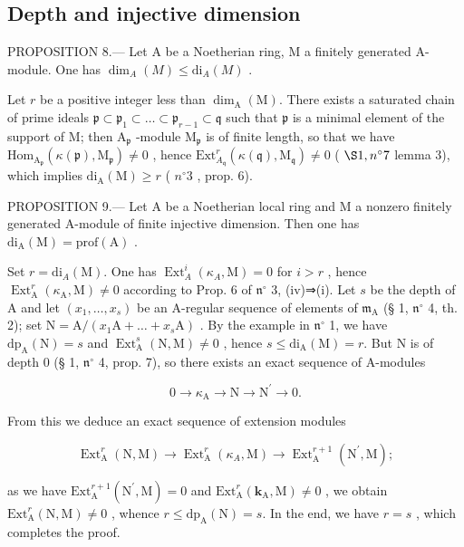 \subsection{Depth and injective dimension}

PROPOSITION 8.--- Let A be a Noetherian ring, M a finitely generated A-module. One has \(\dim_{A}(M) \leqslant \mathrm{di}_{A}(M)\) .

Let \(r\) be a positive integer less than \(\dim_{\mathrm{A}}(\mathrm{M})\). There exists a saturated chain of prime ideals \(\mathfrak{p} \subset \mathfrak{p}_{1} \subset \ldots \subset \mathfrak{p}_{r-1} \subset \mathfrak{q}\) such that \(\mathfrak{p}\) is a minimal element of the support of M; then \(\mathrm{A}_{\mathfrak{p}}\) -module \(\mathrm{M}_{\mathfrak{p}}\) is of finite length, so that we have \(\mathrm{Hom}_{\mathrm{A}_{\mathfrak{p}}}(\kappa(\mathfrak{p}), \mathrm{M}_{\mathfrak{p}}) \neq 0\) , hence \(\mathrm{Ext}_{A_{\mathfrak{q}}}^{r}(\kappa(\mathfrak{q}), \mathrm{M}_{\mathfrak{q}}) \neq 0\) ( \(\S 1, n^{\circ} 7\) lemma 3), which implies \(\mathrm{di}_{\mathrm{A}}(\mathrm{M}) \geqslant r\) ( \(n^{\circ} 3\) , prop. 6).

PROPOSITION 9.--- Let A be a Noetherian local ring and M a nonzero finitely generated A-module of finite injective dimension. Then one has \(\mathrm{di}_{\mathrm{A}}(\mathrm{M}) = \mathrm{prof}(\mathrm{A})\) .

Set \(r = \mathrm{di}_{A}(\mathrm{M})\). One has \(\operatorname{Ext}_{A}^{i}(\kappa_{A}, \mathrm{M}) = 0\) for \(i > r\) , hence \(\operatorname{Ext}_{\mathrm{A}}^{r}(\kappa_{\mathrm{A}}, \mathrm{M}) \neq 0\) according to Prop. 6 of \(\mathfrak{n}^{\circ}\) 3, (iv)⇒(i). Let \(s\) be the depth of A and let \((x_1, \ldots, x_s)\) be an A-regular sequence of elements of \(\mathfrak{m}_{\mathrm{A}}\) (§ 1, \(\mathfrak{n}^{\circ}\) 4, th. 2); set \(\mathrm{N} = \mathrm{A}/(x_1\mathrm{A} + \ldots + x_s\mathrm{A})\) . By the example in \(\mathfrak{n}^{\circ}\) 1, we have \(\mathrm{dp}_{\mathrm{A}}(\mathrm{N}) = s\) and \(\operatorname{Ext}_{\mathrm{A}}^{s}(\mathrm{N}, \mathrm{M}) \neq 0\) , hence \(s \leqslant \mathrm{di}_{\mathrm{A}}(\mathrm{M}) = r\). But N is of depth 0 (§ 1, \(\mathfrak{n}^{\circ}\) 4, prop. 7), so there exists an exact sequence of A-modules

\[
0 \rightarrow \kappa_ {\mathrm{A}} \longrightarrow \mathrm{N} \longrightarrow \mathrm{N} ^ {\prime} \rightarrow 0.
\]

From this we deduce an exact sequence of extension modules

\[
\operatorname{Ext} _ {\mathrm{A}} ^ {r} (\mathrm{N}, \mathrm{M}) \longrightarrow \operatorname{Ext} _ {\mathrm{A}} ^ {r} (\kappa_ {A}, \mathrm{M}) \longrightarrow \operatorname{Ext} _ {\mathrm{A}} ^ {r + 1} (\mathrm{N} ^ {\prime}, \mathrm{M});
\]

as we have \(\mathrm{Ext}_{\mathrm{A}}^{r + 1}(\mathrm{N}^{\prime},\mathrm{M}) = 0\) and \(\mathrm{Ext}_{\mathrm{A}}^{r}(\mathbf{k}_{\mathrm{A}},\mathrm{M})\neq 0\) , we obtain \(\mathrm{Ext}_{\mathrm{A}}^{r}(\mathrm{N},\mathrm{M})\neq 0\) , whence \(r\leqslant \mathrm{dp}_{\mathrm{A}}(\mathrm{N}) = s\). In the end, we have \(r = s\) , which completes the proof.
\relax{}
